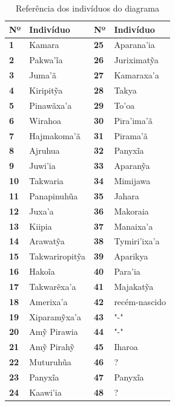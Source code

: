 \begin{table}[H]
\centering
\caption{Referência dos indivíduos do diagrama}
\label{my-label}
\begin{tabular}{|l|l|l|l|}
\hline
\textbf{Nº} & \textbf{Indivíduo} & \textbf{Nº} & \textbf{Indivíduo} \\ \hline
\textbf{1}  & Kamara             & \textbf{25} & Aparana'ia         \\ \hline
\textbf{2}  & Pakwa'ĩa           & \textbf{26} & Juriximatỹa       \\ \hline
\textbf{3}  & Juma'ã             & \textbf{27} & Kamaraxa’a         \\ \hline
\textbf{4}  & Kiripitỹa         & \textbf{28} & Takya              \\ \hline
\textbf{5}  & Pinawãxa'a         & \textbf{29} & To'oa              \\ \hline
\textbf{6}  & Wirahoa            & \textbf{30} & Pira’ima'ã         \\ \hline
\textbf{7}  & Hajmakoma'ã        & \textbf{31} & Pirama'ã           \\ \hline
\textbf{8}  & Ajruhua            & \textbf{32} & Panyxĩa           \\ \hline
\textbf{9}  & Juwi'ia            & \textbf{33} & Aparanỹa          \\ \hline
\textbf{10} & Takwaria           & \textbf{34} & Mimijawa           \\ \hline
\textbf{11} & Panapinuhũa       & \textbf{35} & Jahara             \\ \hline
\textbf{12} & Juxa'a             & \textbf{36} & Makoraia           \\ \hline
\textbf{13} & Kiipia             & \textbf{37} & Manaixa'a          \\ \hline
\textbf{14} & Arawatỹa          & \textbf{38} & Tymiri'ixa'a       \\ \hline
\textbf{15} & Takwariropitỹa    & \textbf{39} & Aparikya           \\ \hline
\textbf{16} & Hakoĩa            & \textbf{40} & Para'ia            \\ \hline
\textbf{17} & Takwarẽxa’a       & \textbf{41} & Majakatỹa         \\ \hline
\textbf{18} & Amerixa’a          & \textbf{42} & recém-nascido      \\ \hline
\textbf{19} & Xiparamỹxa’a      & \textbf{43} & "-"                \\ \hline
\textbf{20} & Amỹ Pirawia       & \textbf{44} & "-"                \\ \hline
\textbf{21} & Amỹ Pirahỹ       & \textbf{45} & Iharoa             \\ \hline
\textbf{22} & Muturuhũa         & \textbf{46} & ?                  \\ \hline
\textbf{23} & Panyxĩa           & \textbf{47} & Panyxĩa           \\ \hline
\textbf{24} & Kaawi'ia           & \textbf{48} & ?                  \\ \hline
\end{tabular}
\end{table}

